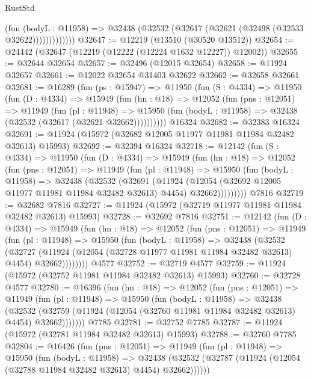\begin{lexlean}{RustStd}
\begin{coremodule}
{\begin{coremodule}
{{{{{{{{{{{{{{{{{{{{{{{{{{{{{{{{{{{{{{{{{{{{{{{{{{{{{{{{{{{{{{{{{{{{{{{{{{{{{{{{                  (fun (bodyL : @11958) =>
                  @32438 (@32532 (@32617 (@32621 (@32498 (@32533 @32622)))))))))))))
@32647 := @12219 (@13510 (@30520 @13512))
@32654 := @24442 (@32647 (@12219 (@12222 (@12224 @1632 @12227)) @12002))
@32655 := @32644 @32654
@32657 := @32496 (@12015 @32654)
@32658 := @11924 @32657
@32661 := @12022 @32654 @31403 @32622
@32662 := @32658 @32661
@32681 := @16289
    (fun (ps : @15947) =>
    @11950
      (fun (S : @4334) =>
      @11950
        (fun (D : @4334) =>
        @15949
          (fun (hn : @18) =>
          @12052
            (fun (pns : @12051) =>
            @11949
              (fun (pl : @11948) =>
              @15950 (fun (bodyL : @11958) => @32438 (@32532 (@32617 (@32621 @32662))))))))))
    @16324
@32682 := @32383 @16324
@32691 := @11924 (@15972 (@32682 @12005 @11977 @11981 @11984 @32482 @32613) @15993)
@32692 := @32394 @16324
@32718 := @12142
    (fun (S : @4334) =>
    @11950
      (fun (D : @4334) =>
      @15949
        (fun (hn : @18) =>
        @12052
          (fun (pns : @12051) =>
          @11949
            (fun (pl : @11948) =>
            @15950
              (fun (bodyL : @11958) =>
              @32438
                (@32532
                  (@32691
                    (@11924
                      (@12054 (@32692 @12005 @11977 @11981 @11984 @32482 @32613) @4454)
                      @32662)))))))))
    @7816
@32719 := @32682 @7816
@32727 := @11924 (@15972 (@32719 @11977 @11981 @11984 @32482 @32613) @15993)
@32728 := @32692 @7816
@32751 := @12142
    (fun (D : @4334) =>
    @15949
      (fun (hn : @18) =>
      @12052
        (fun (pns : @12051) =>
        @11949
          (fun (pl : @11948) =>
          @15950
            (fun (bodyL : @11958) =>
            @32438
              (@32532
                (@32727
                  (@11924 (@12054 (@32728 @11977 @11981 @11984 @32482 @32613) @4454) @32662))))))))
    @4577
@32752 := @32719 @4577
@32759 := @11924 (@15972 (@32752 @11981 @11984 @32482 @32613) @15993)
@32760 := @32728 @4577
@32780 := @16396
    (fun (hn : @18) =>
    @12052
      (fun (pns : @12051) =>
      @11949
        (fun (pl : @11948) =>
        @15950
          (fun (bodyL : @11958) =>
          @32438
            (@32532
              (@32759 (@11924 (@12054 (@32760 @11981 @11984 @32482 @32613) @4454) @32662)))))))
    @7785
@32781 := @32752 @7785
@32787 := @11924 (@15972 (@32781 @11984 @32482 @32613) @15993)
@32788 := @32760 @7785
@32804 := @16426
    (fun (pns : @12051) =>
    @11949
      (fun (pl : @11948) =>
      @15950
        (fun (bodyL : @11958) =>
        @32438 (@32532 (@32787 (@11924 (@12054 (@32788 @11984 @32482 @32613) @4454) @32662))))))
}}}}}}}}}}}}}}}}}}}}}}}}}}}}}}}}}}}}}}}}}}}}}}}}}}}}}}}}}}}}}}}}}}}}}}}}}}}}}}}}
\end{coremodule}}
\end{coremodule}
\end{lexlean}
